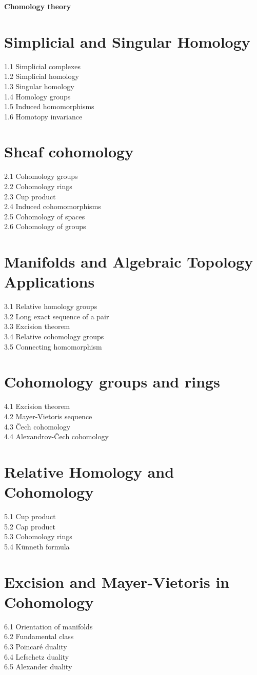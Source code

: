﻿{\LARGE \bf{Chomology theory}}

\section{Simplicial and Singular Homology}
1.1 Simplicial complexes\\
1.2 Simplicial homology\\
1.3 Singular homology\\
1.4 Homology groups\\
1.5 Induced homomorphisms\\
1.6 Homotopy invariance
\section{Sheaf cohomology}
2.1 Cohomology groups\\
2.2 Cohomology rings\\
2.3 Cup product\\
2.4 Induced cohomomorphisms\\
2.5 Cohomology of spaces\\
2.6 Cohomology of groups
\section{Manifolds and Algebraic Topology Applications}
3.1 Relative homology groups\\
3.2 Long exact sequence of a pair\\
3.3 Excision theorem\\
3.4 Relative cohomology groups\\
3.5 Connecting homomorphism
\section{Cohomology groups and rings}
4.1 Excision theorem\\
4.2 Mayer-Vietoris sequence\\
4.3 Čech cohomology\\
4.4 Alexandrov-Čech cohomology
\section{Relative Homology and Cohomology}
5.1 Cup product\\
5.2 Cap product\\
5.3 Cohomology rings\\
5.4 Künneth formula
\section{Excision and Mayer-Vietoris in Cohomology}
6.1 Orientation of manifolds\\
6.2 Fundamental class\\
6.3 Poincaré duality\\
6.4 Lefschetz duality\\
6.5 Alexander duality
